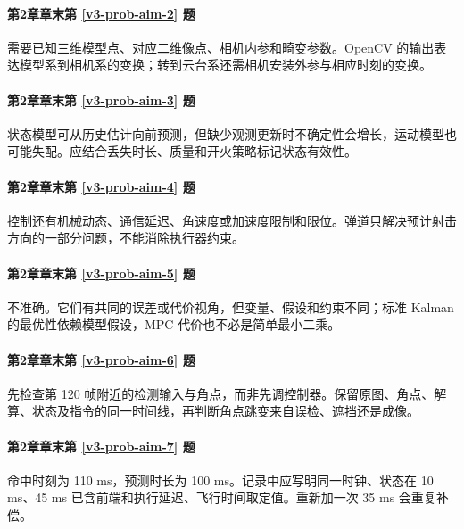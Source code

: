 \paragraph*{第2章章末第 \ref{v3-prob-aim-2} 题}
\begin{solution}
需要已知三维模型点、对应二维像点、相机内参和畸变参数。OpenCV 的输出表达模型系到相机系的变换；转到云台系还需相机安装外参与相应时刻的变换。
\end{solution}

\paragraph*{第2章章末第 \ref{v3-prob-aim-3} 题}
\begin{solution}
状态模型可从历史估计向前预测，但缺少观测更新时不确定性会增长，运动模型也可能失配。应结合丢失时长、质量和开火策略标记状态有效性。
\end{solution}

\paragraph*{第2章章末第 \ref{v3-prob-aim-4} 题}
\begin{solution}
控制还有机械动态、通信延迟、角速度或加速度限制和限位。弹道只解决预计射击方向的一部分问题，不能消除执行器约束。
\end{solution}

\paragraph*{第2章章末第 \ref{v3-prob-aim-5} 题}
\begin{solution}
不准确。它们有共同的误差或代价视角，但变量、假设和约束不同；标准 Kalman 的最优性依赖模型假设，MPC 代价也不必是简单最小二乘。
\end{solution}

\paragraph*{第2章章末第 \ref{v3-prob-aim-6} 题}
\begin{solution}
先检查第 120 帧附近的检测输入与角点，而非先调控制器。保留原图、角点、解算、状态及指令的同一时间线，再判断角点跳变来自误检、遮挡还是成像。
\end{solution}

\paragraph*{第2章章末第 \ref{v3-prob-aim-7} 题}
\begin{solution}
命中时刻为 110 ms，预测时长为 100 ms。记录中应写明同一时钟、状态在 10 ms、45 ms 已含前端和执行延迟、飞行时间取定值。重新加一次 35 ms 会重复补偿。
\end{solution}

